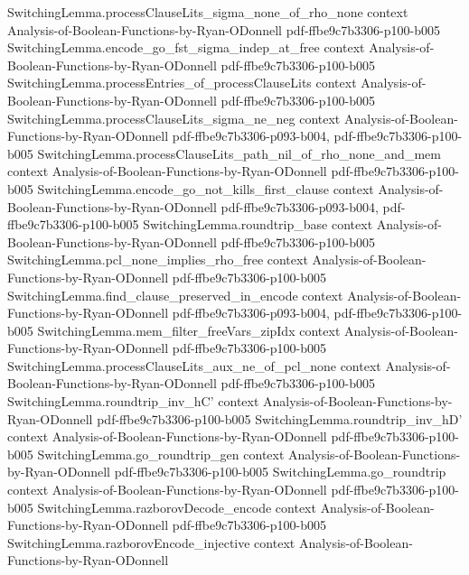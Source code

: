 \begin{lemma}
\proofstep
  {SwitchingLemma.processClauseLits_sigma_none_of_rho_none}
  {context}
  {Analysis-of-Boolean-Functions-by-Ryan-ODonnell}
  {pdf-ffbe9c7b3306-p100-b005}
\proofstep
  {SwitchingLemma.encode_go_fst_sigma_indep_at_free}
  {context}
  {Analysis-of-Boolean-Functions-by-Ryan-ODonnell}
  {pdf-ffbe9c7b3306-p100-b005}
\proofstep
  {SwitchingLemma.processEntries_of_processClauseLits}
  {context}
  {Analysis-of-Boolean-Functions-by-Ryan-ODonnell}
  {pdf-ffbe9c7b3306-p100-b005}
\proofstep
  {SwitchingLemma.processClauseLits_sigma_ne_neg}
  {context}
  {Analysis-of-Boolean-Functions-by-Ryan-ODonnell}
  {pdf-ffbe9c7b3306-p093-b004,
    pdf-ffbe9c7b3306-p100-b005}
\proofstep
  {SwitchingLemma.processClauseLits_path_nil_of_rho_none_and_mem}
  {context}
  {Analysis-of-Boolean-Functions-by-Ryan-ODonnell}
  {pdf-ffbe9c7b3306-p100-b005}
\proofstep
  {SwitchingLemma.encode_go_not_kills_first_clause}
  {context}
  {Analysis-of-Boolean-Functions-by-Ryan-ODonnell}
  {pdf-ffbe9c7b3306-p093-b004,
    pdf-ffbe9c7b3306-p100-b005}
\proofstep
  {SwitchingLemma.roundtrip_base}
  {context}
  {Analysis-of-Boolean-Functions-by-Ryan-ODonnell}
  {pdf-ffbe9c7b3306-p100-b005}
\proofstep
  {SwitchingLemma.pcl_none_implies_rho_free}
  {context}
  {Analysis-of-Boolean-Functions-by-Ryan-ODonnell}
  {pdf-ffbe9c7b3306-p100-b005}
\proofstep
  {SwitchingLemma.find_clause_preserved_in_encode}
  {context}
  {Analysis-of-Boolean-Functions-by-Ryan-ODonnell}
  {pdf-ffbe9c7b3306-p093-b004,
    pdf-ffbe9c7b3306-p100-b005}
\proofstep
  {SwitchingLemma.mem_filter_freeVars_zipIdx}
  {context}
  {Analysis-of-Boolean-Functions-by-Ryan-ODonnell}
  {pdf-ffbe9c7b3306-p100-b005}
\proofstep
  {SwitchingLemma.processClauseLits_aux_ne_of_pcl_none}
  {context}
  {Analysis-of-Boolean-Functions-by-Ryan-ODonnell}
  {pdf-ffbe9c7b3306-p100-b005}
\proofstep
  {SwitchingLemma.roundtrip_inv_hC'}
  {context}
  {Analysis-of-Boolean-Functions-by-Ryan-ODonnell}
  {pdf-ffbe9c7b3306-p100-b005}
\proofstep
  {SwitchingLemma.roundtrip_inv_hD'}
  {context}
  {Analysis-of-Boolean-Functions-by-Ryan-ODonnell}
  {pdf-ffbe9c7b3306-p100-b005}
\proofstep
  {SwitchingLemma.go_roundtrip_gen}
  {context}
  {Analysis-of-Boolean-Functions-by-Ryan-ODonnell}
  {pdf-ffbe9c7b3306-p100-b005}
\proofstep
  {SwitchingLemma.go_roundtrip}
  {context}
  {Analysis-of-Boolean-Functions-by-Ryan-ODonnell}
  {pdf-ffbe9c7b3306-p100-b005}
\proofstep
  {SwitchingLemma.razborovDecode_encode}
  {context}
  {Analysis-of-Boolean-Functions-by-Ryan-ODonnell}
  {pdf-ffbe9c7b3306-p100-b005}
\proofstep
  {SwitchingLemma.razborovEncode_injective}
  {context}
  {Analysis-of-Boolean-Functions-by-Ryan-ODonnell}

\end{lemma}
